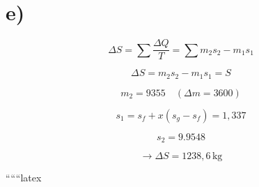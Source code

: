 

\section*{e)}

\begin{equation*}
\Delta S = \sum \frac{\Delta Q}{T} = \sum m_2 s_2 - m_1 s_1
\end{equation*}

\begin{equation*}
\Delta S = m_2 s_2 - m_1 s_1 = S
\end{equation*}

\begin{equation*}
m_2 = 9355 \quad (\Delta m = 3600)
\end{equation*}

\begin{equation*}
s_1 = s_f + x (s_g - s_f) = 1,337
\end{equation*}

\begin{equation*}
s_2 = 9.9548
\end{equation*}

\begin{equation*}
\rightarrow \Delta S = 1238,6 \, \text{kg}
\end{equation*}

``````latex